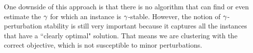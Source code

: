 One downside of this approach is that there is no algorithm that can find or even estimate the  $\gamma$ for which an instance is $\gamma$-stable. However, the notion of $\gamma$-perturbation stability is still very important because it captures all the instances that have a ``clearly optimal" solution. That means we are clustering with the correct objective, which is not susceptible to minor perturbations.






